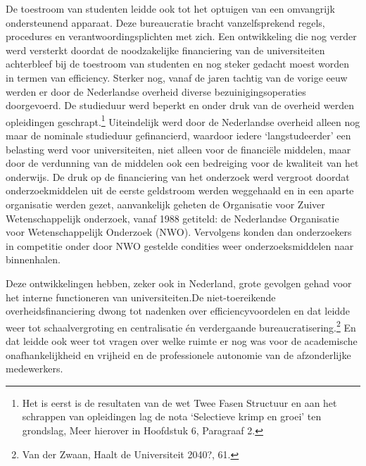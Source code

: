 \documentclass{jote-book}
\begin{document}
	De toestroom van studenten leidde ook tot het optuigen van een omvangrijk ondersteunend apparaat. Deze bureaucratie bracht vanzelfsprekend regels, procedures en verantwoordingsplichten met zich. Een ontwikkeling die nog verder werd versterkt doordat de noodzakelijke financiering van de universiteiten achterbleef bij de toestroom van studenten en nog steker gedacht moest worden in termen van efficiency. Sterker nog, vanaf de jaren tachtig van de vorige eeuw werden er door de Nederlandse overheid diverse bezuinigingsoperaties doorgevoerd. De studieduur werd beperkt en onder druk van de overheid werden opleidingen geschrapt.\footnote{Het is eerst is de resultaten van de wet Twee Fasen Structuur en aan het schrappen van opleidingen lag de nota ‘Selectieve krimp en groei' ten grondslag, Meer hierover in Hoofdstuk 6, Paragraaf 2.} Uiteindelijk werd door de Nederlandse overheid alleen nog maar de nominale studieduur gefinancierd, waardoor iedere ‘langstudeerder' een belasting werd voor universiteiten, niet alleen voor de financiële middelen, maar door de verdunning van de middelen ook een bedreiging voor de kwaliteit van het onderwijs. De druk op de financiering van het onderzoek werd vergroot doordat onderzoekmiddelen uit de eerste geldstroom werden weggehaald en in een aparte organisatie werden gezet, aanvankelijk geheten de Organisatie voor Zuiver Wetenschappelijk onderzoek, vanaf 1988 getiteld: de Nederlandse Organisatie voor Wetenschappelijk Onderzoek (NWO). Vervolgens konden dan onderzoekers in competitie onder door NWO gestelde condities weer onderzoeksmiddelen naar binnenhalen.



	Deze ontwikkelingen hebben, zeker ook in Nederland, grote gevolgen gehad voor het interne functioneren van universiteiten.\fbox{ }De niet-toereikende overheidsfinanciering dwong tot nadenken over efficiencyvoordelen en dat leidde weer tot schaalvergroting en centralisatie én verdergaande bureaucratisering.\footnote{Van der Zwaan, Haalt de Universiteit 2040?, 61. } En dat leidde ook weer tot vragen over welke ruimte er nog was voor de academische onafhankelijkheid en vrijheid en de professionele autonomie van de afzonderlijke medewerkers.
\end{document}
